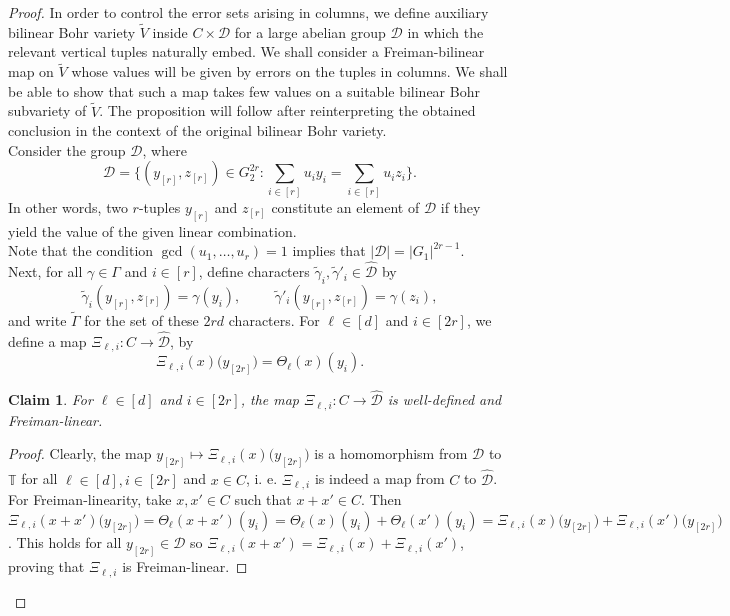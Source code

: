 \documentclass[a4paper,11pt]{article}
\numberwithin{theorem}{section}
\newtheorem{claim}[theorem]{Claim}
\theoremstyle{definition}
\newcommand{\on}[1]{
	\operatorname{#1}
}
\begin{document}
\vspace{\baselineskip}

\begin{proof}
    In order to control the error sets arising in columns, we define auxiliary bilinear Bohr variety $\tilde{V}$ inside $C \times \mathcal{D}$ for a large abelian group $\mathcal{D}$ in which the relevant vertical tuples naturally embed. We shall consider a Freiman-bilinear map on $\tilde{V}$ whose values will be given by errors on the tuples in columns. We shall be able to show that such a map takes few values on a suitable bilinear Bohr subvariety of $\tilde{V}$. The proposition will follow after reinterpreting the obtained conclusion in the context of the original bilinear Bohr variety.\\

    Consider the group $\mathcal{D}$, where 
        \[\mathcal{D} = \Big\{(y_{[r]}, z_{[r]})\in G_2^{2r} : \sum_{i\in [r]} u_i y_i = \sum_{i\in [r]} u_i z_i\Big\}.\]
    \noindent In other words, two $r$-tuples $y_{[r]}$ and $z_{[r]}$ constitute an element of $\mathcal{D}$ if they yield the value of the given linear combination.\\
    \indent Note that the condition $\on{gcd}(u_1, \dots, u_r) = 1$ implies that $|\mathcal{D}| = |G_1|^{2r - 1}$.\\
    \indent Next, for all $\gamma \in \Gamma$ and $i \in [r]$, define characters $\tilde{\gamma}_i, \tilde{\gamma}'_i \in  \hat{\mathcal{D}}$ by
    \[\tilde{\gamma}_i (y_{[r]}, z_{[r]}) = \gamma(y_i),\hspace{1cm}\tilde{\gamma}'_i (y_{[r]}, z_{[r]}) = \gamma(z_i),\]
    and write $\tilde{\Gamma}$ for the set of these $2rd$ characters. For $\ell \in [d]$ and $i \in [2r]$, we define a map $\Xi_{\ell, i} : C \to \hat{\mathcal{D}}$,  by 
    \[\Xi_{\ell, i}(x)\Big(y_{[2r]}\Big) = \Theta_\ell(x)(y_i).\]
    
    \vspace{\baselineskip}
    
    \begin{claim}
         For $\ell \in [d]$ and $i \in [2r]$, the map $\Xi_{\ell, i} : C \to \hat{\mathcal{D}}$ is well-defined and Freiman-linear.
    \end{claim}
    
    \begin{proof}
        Clearly, the map $y_{[2r]}\mapsto \Xi_{\ell, i}(x)\Big(y_{[2r]}\Big)$ is a homomorphism from $\mathcal{D}$ to $\mathbb{T}$ for all $\ell \in [d], i \in [2r]$ and $x \in C$, i. e. $\Xi_{\ell, i}$ is indeed a map from $C$ to $\hat{\mathcal{D}}$. For Freiman-linearity, take $x, x' \in C$ such that $x + x' \in C$. Then $\Xi_{\ell, i}(x + x')\Big(y_{[2r]}\Big) = \Theta_\ell(x+x')(y_i) = \Theta_\ell(x)(y_i) + \Theta_\ell(x')(y_i) = \Xi_{\ell, i}(x)\Big(y_{[2r]}\Big) + \Xi_{\ell, i}(x')\Big(y_{[2r]}\Big)$. This holds for all $y_{[2r]} \in \mathcal{D}$ so $\Xi_{\ell, i}(x + x') = \Xi_{\ell, i}(x) + \Xi_{\ell, i}(x')$, proving that $\Xi_{\ell, i}$ is Freiman-linear.
    \end{proof}
    

\end{proof}
\end{document}

